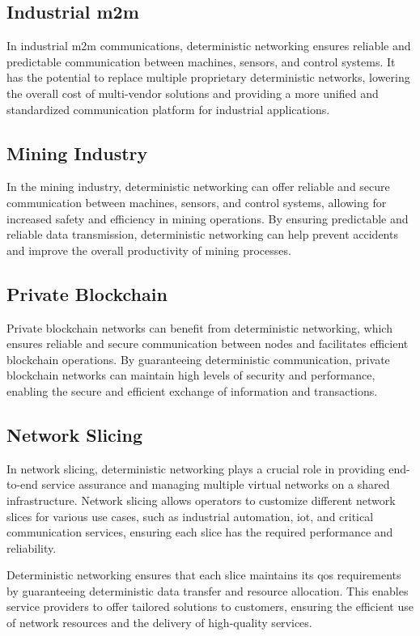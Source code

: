 \documentclass[runningheads]{llncs}
\begin{document}
\subsection{Industrial \gls{m2m}}
In industrial \gls{m2m} communications, deterministic networking ensures reliable and predictable communication between machines, sensors, and control systems. It has the potential to replace multiple proprietary deterministic networks, lowering the overall cost of multi-vendor solutions and providing a more unified and standardized communication platform for industrial applications.

\subsection{Mining Industry}
In the mining industry, deterministic networking can offer reliable and secure communication between machines, sensors, and control systems, allowing for increased safety and efficiency in mining operations. By ensuring predictable and reliable data transmission, deterministic networking can help prevent accidents and improve the overall productivity of mining processes.

\subsection{Private Blockchain}
Private blockchain networks can benefit from deterministic networking, which ensures reliable and secure communication between nodes and facilitates efficient blockchain operations. By guaranteeing deterministic communication, private blockchain networks can maintain high levels of security and performance, enabling the secure and efficient exchange of information and transactions.

\subsection{Network Slicing}
In network slicing, deterministic networking plays a crucial role in providing end-to-end service assurance and managing multiple virtual networks on a shared infrastructure. Network slicing allows operators to customize different network slices for various use cases, such as industrial automation, \gls{iot}, and critical communication services, ensuring each slice has the required performance and reliability.

Deterministic networking ensures that each slice maintains its \gls{qos} requirements by guaranteeing deterministic data transfer and resource allocation. This enables service providers to offer tailored solutions to customers, ensuring the efficient use of network resources and the delivery of high-quality services.
\end{document}
